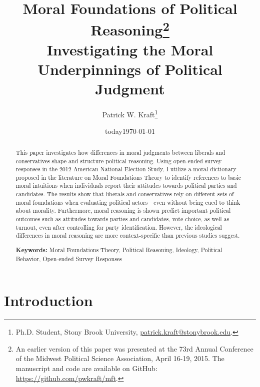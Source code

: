 \documentclass[12pt]{article}
\author{Patrick W. Kraft\footnote{Ph.D. Student, Stony Brook University, \href{mailto:patrick.kraft@stonybrook.edu}{patrick.kraft@stonybrook.edu}.
}}
\date{today}
\title{Moral Foundations of Political Reasoning\footnote{An earlier version of this paper was presented at the 73rd Annual Conference of the Midwest Political Science Association, April 16-19, 2015. The manuscript and code are available on GitHub: \url{https://github.com/pwkraft/mft}.}\\
\large{Investigating the Moral Underpinnings of Political Judgment}}
\date{\today}
\begin{document}
\maketitle
\onehalfspacing

\begin{abstract}
This paper investigates how differences in moral judgments between liberals and conservatives shape and structure political reasoning. Using open-ended survey responses in the 2012 American National Election Study, I utilize a moral dictionary proposed in the literature on Moral Foundations Theory to identify references to basic moral intuitions when individuals report their attitudes towards political parties and candidates. The results show that liberals and conservatives rely on different sets of moral foundations when evaluating political actors---even without being cued to think about morality. Furthermore, moral reasoning is shown predict important political outcomes such as attitudes towards parties and candidates, vote choice, as well as turnout, even after controlling for party identification. However, the ideological differences in moral reasoning are more context-specific than previous studies suggest.

\vspace{\baselineskip}
\noindent \textbf{Keywords:} Moral Foundations Theory, Political Reasoning, Ideology, Political Behavior, Open-ended Survey Responses
\end{abstract}
\newpage


\section{Introduction}
\end{document}
